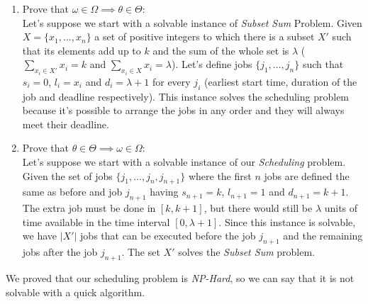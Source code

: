 \documentclass[11pt]{article}
\begin{document}
\begin{enumerate}
	\item Prove that $\omega \in \Omega \implies  \theta \in \Theta$: \\
	Let's suppose we start with a solvable instance of \textit{Subset Sum} Problem. Given $X = \{x_1, ..., x_n\}$ a set of positive integers to which there is a subset $X'$ such that its elements add up to $k$ and the sum of the whole set is $\lambda$ ($\sum\limits_{x_i \in X'}x_i = k$ and $\sum\limits_{x_i \in X}x_i = \lambda$). Let's define jobs $\{j_1, ..., j_n\}$ such that $s_i = 0$, $l_i = x_i$ and $d_i = \lambda + 1$ for every $j_i$ (earliest start time, duration of the job and deadline respectively). This instance solves the scheduling problem because it's possible to arrange the jobs in any order and they will always meet their deadline.
		
	\item Prove that $\theta \in \Theta \implies  \omega \in \Omega$: \\
	Let's suppose we start with a solvable instance of our \textit{Scheduling} problem. Given the set of jobs $\{j_1, ..., j_n, j_{n+1}\}$ where the first $n$ jobs are defined the same as before and job $j_{n+1}$ having $s_{n+1} = k$, $l_{n+1} = 1$ and $d_{n+1} = k+1$. The extra job must be done in $[k, k+1]$, but there would still be $\lambda$ units of time available in the time interval $[0, \lambda+1]$. Since this instance is solvable, we have $|X'|$ jobs that can be executed before the job $j_{n+1}$ and the remaining jobs after the job $j_{n+1}$. The set $X'$ solves the \textit{Subset Sum} problem.
\end{enumerate}
We proved that our scheduling problem is \textit{NP-Hard}, so we can say that it is not solvable with a quick algorithm.
\end{document}
